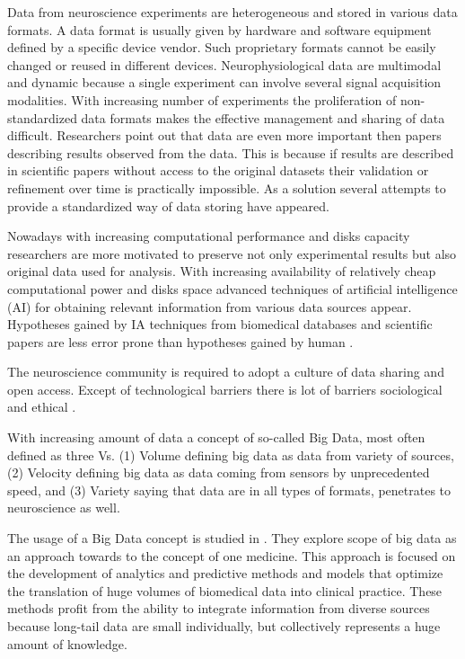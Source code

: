 \documentclass[utf8]{frontiersSCNS} %
\begin{document}
Data from neuroscience experiments are heterogeneous and stored in various data formats. A data format is usually given by hardware and software equipment defined by a specific device vendor. Such proprietary formats cannot be easily changed or reused in different devices. Neurophysiological data are multimodal and dynamic because a single experiment can involve several signal acquisition modalities. With increasing number of experiments the proliferation of non-standardized data formats makes the effective management and sharing of data difficult. Researchers point out that data are even more important then papers describing results observed from the data. This is because if results are described in scientific papers without access to the original datasets their validation or refinement over time is practically impossible. As a solution several attempts to provide a standardized way of data storing have appeared.

Nowadays with increasing computational performance and disks capacity researchers are more motivated to preserve not only experimental results but also original data used for analysis. With increasing availability of relatively cheap computational power and disks space  advanced techniques of artificial intelligence (AI) for obtaining relevant information from various data sources appear. Hypotheses gained by IA techniques from biomedical databases and  scientific papers are less error prone than hypotheses gained by human \citep{Gil171}.

The neuroscience community is required to adopt a culture of data sharing and open access. Except of technological barriers there is lot of barriers sociological and ethical  \citep{10.3389/fnhum.2014.00239}.

With increasing amount of data a concept of so-called Big Data, most often defined as three Vs\citep{mcafee2012big}. (1) Volume defining big data as data from variety of sources, (2) Velocity defining big data as data coming from sensors by unprecedented speed, and (3) Variety saying that data are in all types of formats, penetrates to neuroscience as well.

The usage of a Big Data concept is studied in \citep{10.3389/fvets.2017.00194}. They explore scope of big data as an approach towards to the concept of one medicine. This approach is focused on the development of analytics and predictive methods and models that optimize the translation of huge volumes of biomedical data into clinical practice. These methods profit from the ability to integrate information from diverse sources because long-tail data are small individually, but collectively represents a huge amount of knowledge.
\end{document}

